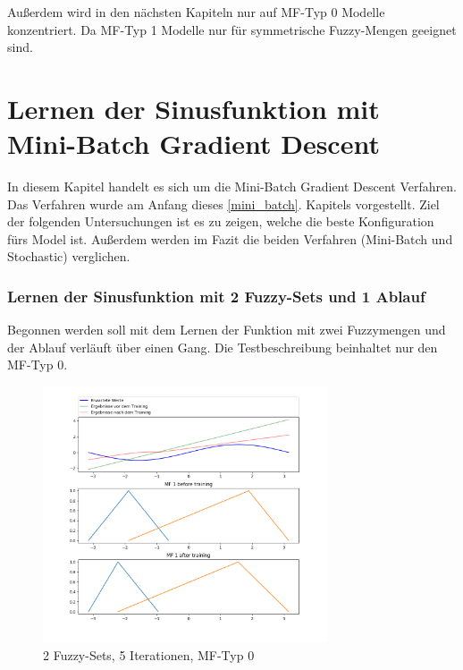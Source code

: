 {Außerdem wird in den nächsten Kapiteln nur auf MF-Typ 0 Modelle konzentriert. Da MF-Typ 1 Modelle nur für symmetrische Fuzzy-Mengen geeignet sind.
%	
\section{Lernen der Sinusfunktion mit Mini-Batch Gradient Descent}\label{lernen_mb}

In diesem Kapitel handelt es sich um die Mini-Batch Gradient Descent Verfahren. Das Verfahren wurde am Anfang dieses \ref{mini_batch}. Kapitels vorgestellt. Ziel der folgenden Untersuchungen ist es zu zeigen, welche die beste Konfiguration fürs Model ist. Außerdem werden im Fazit die beiden Verfahren (Mini-Batch und Stochastic) verglichen. 

\subsubsection{Lernen der Sinusfunktion mit 2 Fuzzy-Sets und 1 Ablauf}

Begonnen werden soll mit dem Lernen der Funktion mit zwei Fuzzymengen und der Ablauf verläuft über einen Gang. Die Testbeschreibung beinhaltet nur den MF-Typ 0.

\begin{figure}[htbp]
	\centering
	\includegraphics[width=0.75\textwidth]{images/sinus/Mini-Batch/sinus 1 Input 2 Sets 5 Epochs Mini-Batch Gradient Descent two equations mf.png}
	\caption{2 Fuzzy-Sets, 5 Iterationen, MF-Typ 0} \label{2mini_batch5:0}
\end{figure}

}
